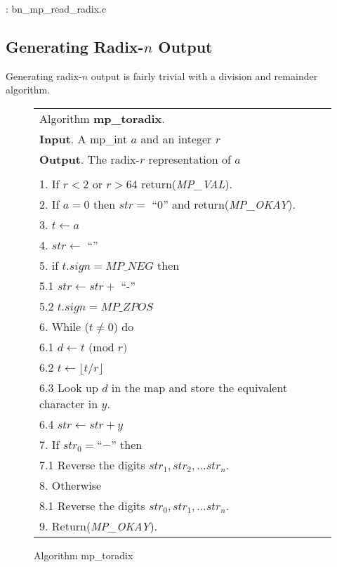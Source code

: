 \documentclass[b5paper]{book}
\begin{document}
\vspace{+3mm}\begin{small}
\hspace{-5.1mm}{\bf File}: bn\_mp\_read\_radix.c
\vspace{-3mm}
\begin{alltt}
\end{alltt}
\end{small}

\subsection{Generating Radix-$n$ Output}
Generating radix-$n$ output is fairly trivial with a division and remainder algorithm.  

\newpage\begin{figure}[!here]
\begin{small}
\begin{center}
\begin{tabular}{l}
\hline Algorithm \textbf{mp\_toradix}. \\
\textbf{Input}.   A mp\_int $a$ and an integer $r$\\
\textbf{Output}.  The radix-$r$ representation of $a$ \\
\hline \\
1.  If $r < 2$ or $r > 64$ return(\textit{MP\_VAL}). \\
2.  If $a = 0$ then $str = $ ``$0$'' and return(\textit{MP\_OKAY}).  \\
3.  $t \leftarrow a$ \\
4.  $str \leftarrow$ ``'' \\
5.  if $t.sign = MP\_NEG$ then \\
\hspace{3mm}5.1  $str \leftarrow str + $ ``-'' \\
\hspace{3mm}5.2  $t.sign = MP\_ZPOS$ \\
6.  While ($t \ne 0$) do \\
\hspace{3mm}6.1  $d \leftarrow t \mbox{ (mod }r\mbox{)}$ \\
\hspace{3mm}6.2  $t \leftarrow \lfloor t / r \rfloor$ \\
\hspace{3mm}6.3  Look up $d$ in the map and store the equivalent character in $y$. \\
\hspace{3mm}6.4  $str \leftarrow str + y$ \\
7.  If $str_0 = $``$-$'' then \\
\hspace{3mm}7.1  Reverse the digits $str_1, str_2, \ldots str_n$. \\
8.  Otherwise \\
\hspace{3mm}8.1  Reverse the digits $str_0, str_1, \ldots str_n$. \\
9.  Return(\textit{MP\_OKAY}).\\
\hline
\end{tabular}
\end{center}
\end{small}
\caption{Algorithm mp\_toradix}
\end{figure}
\end{document}
